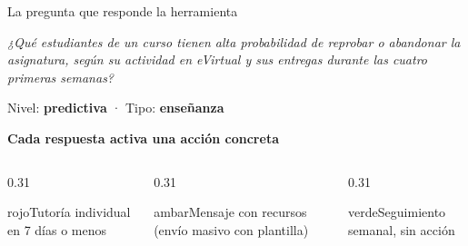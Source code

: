 \documentclass[aspectratio=169,10pt]{beamer}
\begin{document}
\begin{frame}{La pregunta que responde la herramienta}
\begin{tcolorbox}[colback=azulclaro,colframe=azul,boxrule=0pt,leftrule=4pt,arc=0pt,left=10pt,top=8pt,bottom=8pt]
\large\itshape ¿Qué estudiantes de un curso tienen alta probabilidad de reprobar o abandonar la asignatura, según su actividad en eVirtual y sus entregas durante las cuatro primeras semanas?
\end{tcolorbox}
\vspace{2pt}
{\small\color{gris} Nivel: \textbf{predictiva} \quad · \quad Tipo: \textbf{enseñanza}}
\vspace{8pt}

\textbf{Cada respuesta activa una acción concreta}
\vspace{4pt}

\begin{columns}[T]
\begin{column}{0.31\textwidth}\begin{tarjeta}{rojo}\small Tutoría individual en 7 días o menos\end{tarjeta}\end{column}
\begin{column}{0.31\textwidth}\begin{tarjeta}{ambar}\small Mensaje con recursos (envío masivo con plantilla)\end{tarjeta}\end{column}
\begin{column}{0.31\textwidth}\begin{tarjeta}{verde}\small Seguimiento semanal, sin acción\end{tarjeta}\end{column}
\end{columns}
\end{frame}
\end{document}
